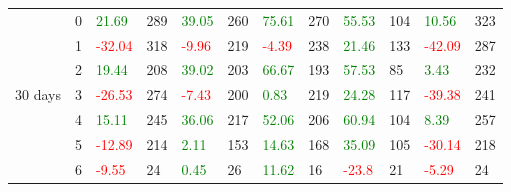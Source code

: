\begin{table}[!htb]
\begin{adjustwidth}{-0.8in}{-0.9in}
\begin{tabular}{|p{4em}|p{2em}|p{3em}|p{3em}|p{3em}|p{3em}|p{3em}|p{3em}|p{3em}|p{3em}|p{3em}|p{3em}|}
            & 0 & \textcolor{green}{21.69} & 289 & \textcolor{green}{39.05} & 260 & \textcolor{green}{75.61} & 270 & \textcolor{green}{55.53} & 104 & \textcolor{green}{10.56} & 323\\\cline{3-12}
            & 1 & \textcolor{red}{-32.04} & 318 & \textcolor{red}{-9.96} & 219 & \textcolor{red}{-4.39} & 238 & \textcolor{green}{21.46} & 133 & \textcolor{red}{-42.09} & 287\\\cline{3-12}
            & 2 & \textcolor{green}{19.44} & 208 & \textcolor{green}{39.02} & 203 & \textcolor{green}{66.67} & 193 & \textcolor{green}{57.53} & 85 & \textcolor{green}{3.43} & 232\\\cline{3-12}
            30 days & 3 & \textcolor{red}{-26.53} & 274 & \textcolor{red}{-7.43} & 200 & \textcolor{green}{0.83} & 219 & \textcolor{green}{24.28} & 117 & \textcolor{red}{-39.38} & 241\\\cline{3-12}
            & 4 & \textcolor{green}{15.11} & 245 & \textcolor{green}{36.06} & 217 & \textcolor{green}{52.06} & 206 & \textcolor{green}{60.94} & 104 & \textcolor{green}{8.39} & 257\\\cline{3-12}
            & 5 & \textcolor{red}{-12.89} & 214 & \textcolor{green}{2.11} & 153 & \textcolor{green}{14.63} & 168 & \textcolor{green}{35.09} & 105 & \textcolor{red}{-30.14} & 218\\\cline{3-12}
            & 6 & \textcolor{red}{-9.55} & 24 & \textcolor{green}{0.45} & 26 & \textcolor{green}{11.62} & 16 & \textcolor{red}{-23.8} & 21 & \textcolor{red}{-5.29} & 24\\\hline\hline


\end{tabular}
\end{adjustwidth}
\end{table}
